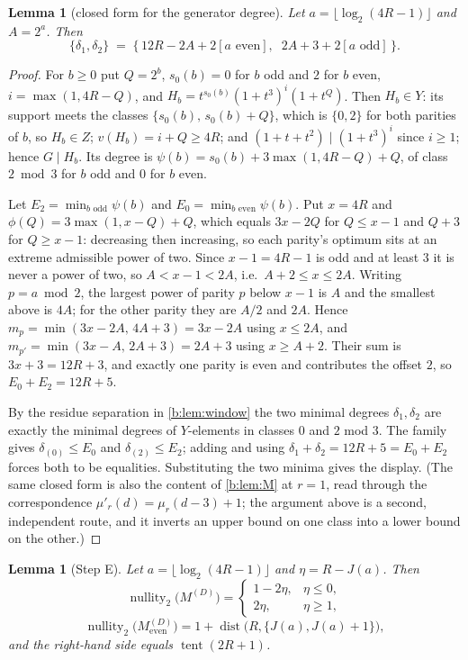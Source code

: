 \documentclass[11pt]{amsart}
\newtheorem{lemma}[theorem]{Lemma}
\theoremstyle{definition}
\theoremstyle{remark}
\begin{document}
\begin{lemma}[closed form for the generator degree]
\label{b:lem:closed}
Let $a = \lfloor \log_2(4R-1) \rfloor$ and $A = 2^a$. Then
\[
  \{\delta_1, \delta_2\} \;=\; \bigl\{\, 12R - 2A + 2[a \text{ even}],\;\; 2A + 3 + 2[a \text{ odd}] \,\bigr\}.
\]
\end{lemma}

\begin{proof}
For $b \ge 0$ put $Q = 2^b$, $s_0(b) = 0$ for $b$ odd and $2$ for $b$ even, $i = \max(1, 4R-Q)$, and $H_b = t^{s_0(b)}(1+t^3)^i(1+t^{Q})$. Then $H_b \in Y$: its support meets the classes $\{s_0(b),\, s_0(b)+Q\}$, which is $\{0,2\}$ for both parities of $b$, so $H_b \in Z$; $v(H_b) = i + Q \ge 4R$; and $(1+t+t^2) \mid (1+t^3)^i$ since $i \ge 1$; hence $G \mid H_b$. Its degree is $\psi(b) = s_0(b) + 3\max(1,4R-Q) + Q$, of class $2 \bmod 3$ for $b$ odd and $0$ for $b$ even.

Let $E_2 = \min_{b \text{ odd}}\psi(b)$ and $E_0 = \min_{b \text{ even}}\psi(b)$. Put $x = 4R$ and $\phi(Q) = 3\max(1,x-Q)+Q$, which equals $3x-2Q$ for $Q \le x-1$ and $Q+3$ for $Q \ge x-1$: decreasing then increasing, so each parity's optimum sits at an extreme admissible power of two. Since $x-1 = 4R-1$ is odd and at least $3$ it is never a power of two, so $A < x-1 < 2A$, i.e.\ $A + 2 \le x \le 2A$. Writing $p = a \bmod 2$, the largest power of parity $p$ below $x-1$ is $A$ and the smallest above is $4A$; for the other parity they are $A/2$ and $2A$. Hence $m_p = \min(3x-2A,\, 4A+3) = 3x-2A$ using $x \le 2A$, and $m_{p'} = \min(3x-A,\, 2A+3) = 2A+3$ using $x \ge A+2$. Their sum is $3x+3 = 12R+3$, and exactly one parity is even and contributes the offset $2$, so $E_0 + E_2 = 12R+5$.

By the residue separation in \cref{b:lem:window} the two minimal degrees $\delta_1, \delta_2$ are exactly the minimal degrees of $Y$-elements in classes $0$ and $2$ mod $3$. The family gives $\delta_{(0)} \le E_0$ and $\delta_{(2)} \le E_2$; adding and using $\delta_1 + \delta_2 = 12R+5 = E_0 + E_2$ forces both to be equalities. Substituting the two minima gives the display. (The same closed form is also the content of \cref{b:lem:M} at $r = 1$, read through the correspondence $\mu'_r(d) = \mu_r(d-3)+1$; the argument above is a second, independent route, and it inverts an upper bound on one class into a lower bound on the other.)
\end{proof}

\begin{lemma}[Step E]
\label{b:lem:stepE}
Let $a = \lfloor \log_2(4R-1) \rfloor$ and $\eta = R - J(a)$. Then
\[
  \operatorname{nullity}_2\bigl(M^{(D)}\bigr) = \begin{cases} 1-2\eta, & \eta \le 0,\\ 2\eta, & \eta \ge 1,\end{cases}
\]
\[
  \operatorname{nullity}_2\bigl(M_{\mathrm{even}}^{(D)}\bigr) = 1 + \operatorname{dist}\bigl(R, \{J(a), J(a)+1\}\bigr),
\]
and the right-hand side equals $\operatorname{tent}(2R+1)$.
\end{lemma}
\end{document}
